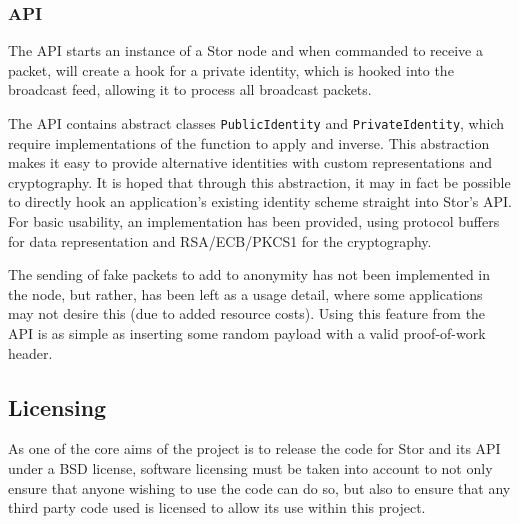 		\subsubsection*{API}
			The API starts an instance of a Stor node and when commanded to receive a packet, will create a hook for a private identity, which is hooked into the broadcast feed, allowing it to process all broadcast packets.
			
			The API contains abstract classes \texttt{PublicIdentity} and \texttt{PrivateIdentity}, which require implementations of the function to apply and inverse. This abstraction makes it easy to provide alternative identities with custom representations and cryptography. It is hoped that through this abstraction, it may in fact be possible to directly hook an application's existing identity scheme straight into Stor's API. For basic usability, an implementation has been provided, using protocol buffers for data representation and RSA/ECB/PKCS1 for the cryptography.
			
			The sending of fake packets to add to anonymity has not been implemented in the node, but rather, has been left as a usage detail, where some applications may not desire this (due to added resource costs). Using this feature from the API is as simple as inserting some random payload with a valid proof-of-work header.
		\subsection{Licensing}
			As one of the core aims of the project is to release the code for Stor and its API under a BSD license, software licensing must be taken into account to not only ensure that anyone wishing to use the code can do so, but also to ensure that any third party code used is licensed to allow its use within this project.
